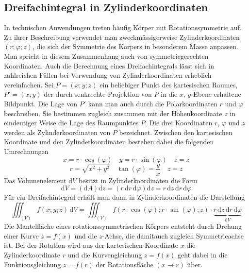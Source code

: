 \subsection{Dreifachintegral in Zylinderkoordinaten}
In technischen Anwendungen treten häufig Körper mit Rotationssymmetrie auf. Zu ihrer Beschreibung verwendet man zweckmässigerweise Zylinderkoordinaten $\left(r; \varphi; z\right)$, die sich der Symmetrie des Körpers in besonderem Masse anpassen. Man spricht in diesem Zusammenhang auch von symmetriegerechten Koordinaten. Auch die Berechnung eines Dreifachintegrals lässt sich in zahlreichen Fällen bei Verwendung von Zylinderkoordinaten erheblich vereinfachen.
\newline\newline
Sei $P=\left(x; y; z\right)$ ein beliebiger Punkt des kartesischen Raumes, $P'=\left(x; y\right)$ der durch senkrechte Projektion von $P$ in die $x$, $y$-Ebene erhaltene Bildpunkt. Die Lage von $P'$ kann man auch durch die Polarkoordinaten $r$ und $\varphi$ beschreiben. Sie bestimmen zugleich zusammen mit der Höhenkoordinate $z$ in eindeutiger Weise die Lage des Raumpunktes $P$. Die drei Koordinaten $r$, $\varphi$ und $z$ werden als Zylinderkoordinaten von $P$ bezeichnet.
\newline\newline
Zwischen den kartesischen Koordinate und den Zylinderkoordinaten bestehen dabei die folgenden Umrechnungen
\begin{equation} 
\boxed{x=r\cdot \cos\left(\varphi\right)}\quad \boxed{y=r\cdot \sin\left(\varphi\right)}\quad \boxed{z=z}
\end{equation}
\begin{equation}
\boxed{r=\sqrt{x^2+y^2}}\quad \boxed{\tan\left(\varphi\right)=\dfrac{y}{x}}\quad \boxed{z=z}
\end{equation}
Das Volumenelement $\text{d}V$ besitzt in Zylinderkoordinaten die Form
\begin{equation}
\boxed{\text{d}V=\left(\text{d}A\right)\text{d}z=\left(r\,\text{d}r\,\text{d}\varphi\right)\text{d}z=r\,\text{d}z\,\text{d}r\,\text{d}\varphi}
\end{equation}
Für ein Dreifachintegral erhält man dann in Zylinderkoordinaten die Darstellung
\begin{equation}
\boxed{\displaystyle \iiint_{\left(V\right)}f\left(x; y; z\right)\,\text{d}V=\displaystyle \iiint_{\left(V\right)}f\left(r\cdot \cos\left(\varphi\right); r\cdot \sin\left(\varphi\right); z\right)\cdot \underbrace{r\,\text{d}z\,\text{d}r\,\text{d}\varphi}_{\text{d}V}}
\end{equation}
Die Mantelfläche eines rotationssymmetrischen Körpers entsteht durch Drehung einer Kurve $z=f\left(x\right)$ und die $z$-Achse, die damitauch zugleich Symmetrieachse ist. Bei der Rotation wird aus der kartesischen Koordinate $x$ die Zylinderkoordinate $r$ und die Kurvengleichung $z=f\left(x\right)$ geht dabei in die Funktionsgleichung $z=f\left(r\right)$ der Rotationsfläche $\left(x\rightarrow r\right)$ über.

